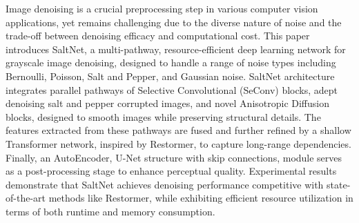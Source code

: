 Image denoising is a crucial preprocessing step in various computer vision applications, yet remains challenging due to the diverse nature of noise and the trade-off between denoising efficacy and computational cost.  This paper introduces SaltNet, a multi-pathway, resource-efficient deep learning network for grayscale image denoising, designed to handle a range of noise types including Bernoulli, Poisson, Salt and Pepper, and Gaussian noise. SaltNet architecture integrates parallel pathways of Selective Convolutional (SeConv) blocks, adept denoising salt and pepper corrupted images\cite{Rafiee2021}, and novel Anisotropic Diffusion blocks, designed to smooth images while preserving structural details.  The features extracted from these pathways are fused and further refined by a shallow Transformer network, inspired by Restormer\cite{Zamir2022}, to capture long-range dependencies. Finally, an AutoEncoder, U-Net structure with skip connections, module serves as a post-processing stage to enhance perceptual quality\cite{Wu2022}.  Experimental results demonstrate that SaltNet achieves denoising performance competitive with state-of-the-art methods like Restormer, while exhibiting efficient resource utilization in terms of both runtime and memory consumption.